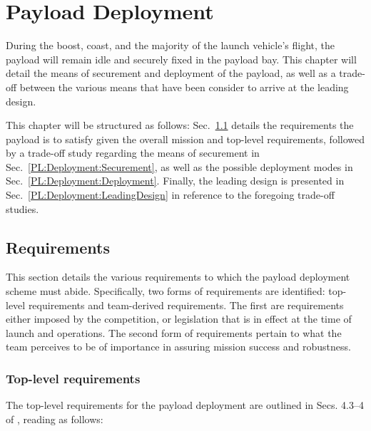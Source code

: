 \chapter{Payload Deployment}

During the boost, coast, and the majority of the launch vehicle's flight, the payload will remain idle and securely fixed in the payload bay. This chapter will detail the means of securement and deployment of the payload, as well as a trade-off between the various means that have been consider to arrive at the leading design.

This chapter will be structured as follows: Sec.~\ref{PL:Deployment:Requirements} details the requirements the payload is to satisfy given the overall mission and top-level requirements, followed by a trade-off study regarding the means of securement in Sec.~\ref{PL:Deployment:Securement}, as well as the possible deployment modes in Sec.~\ref{PL:Deployment:Deployment}. Finally, the leading design is presented in Sec.~\ref{PL:Deployment:LeadingDesign} in reference to the foregoing trade-off studies.


\section{Requirements}\label{PL:Deployment:Requirements}

This section details the various requirements to which the payload deployment scheme must abide. Specifically, two forms of requirements are identified: top-level requirements and team-derived requirements. The first are requirements either imposed by the competition, or legislation that is in effect at the time of launch and operations. The second form of requirements pertain to what the team perceives to be of importance in assuring mission success and robustness.

\subsection{Top-level requirements}

The top-level requirements for the payload deployment are outlined in Secs. 4.3--4 of \citep{MSFC2019}, reading as follows:

